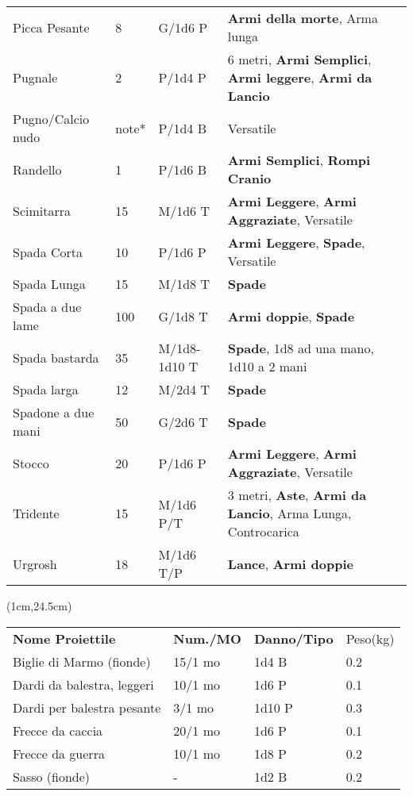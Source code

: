 \documentclass[a4paper,12 pt,openany]{book}
\begin{document}
\begin{textblock*}{19.5cm}
\begin{tabularx}{0.95\textwidth}{llll}
Picca Pesante& 8& G/1d6 P&\textbf{Armi della morte}, Arma lunga\\
Pugnale& 2& P/1d4 P& 6 metri, \textbf{Armi Semplici}, \textbf{Armi leggere}, \textbf{Armi da Lancio}\\
Pugno/Calcio nudo& note*& P/1d4 B&Versatile\\
Randello& 1& P/1d6 B& \textbf{Armi Semplici}, \textbf{Rompi Cranio}\\
Scimitarra& 15 & M/1d6 T&\textbf{Armi Leggere}, \textbf{Armi Aggraziate}, Versatile\\
Spada Corta& 10 & P/1d6 P&\textbf{Armi Leggere}, \textbf{Spade}, Versatile\\
Spada Lunga& 15 & M/1d8 T&\textbf{Spade}\\
Spada a due lame& 100& G/1d8 T& \textbf{Armi doppie}, \textbf{Spade}\\
Spada bastarda& 35 & M/1d8-1d10 T&\textbf{Spade}, 1d8 ad una mano, 1d10 a 2 mani\\
Spada larga& 12 & M/2d4 T&\textbf{Spade}\\
Spadone a due mani& 50 & G/2d6 T&\textbf{Spade}\\
Stocco& 20 & P/1d6 P& \textbf{Armi Leggere}, \textbf{Armi Aggraziate}, Versatile\\
Tridente& 15 & M/1d6 P/T& 3 metri, \textbf{Aste}, \textbf{Armi da Lancio}, Arma Lunga, Controcarica\\
Urgrosh& 18 & M/1d6 T/P& \textbf{Lance}, \textbf{Armi doppie}\\
\end{tabularx}

\end{textblock*}

\begin{textblock*}{11.5cm}(1cm,24.5cm) %

\begin{tabular}{llll}
\textbf{Nome Proiettile}   & \textbf{Num./MO} & \textbf{Danno/Tipo} & Peso(kg) \\
Biglie di Marmo (fionde)   & 15/1 mo                    & 1d4 B               & 0.2      \\
Dardi da balestra, leggeri & 10/1 mo                    & 1d6 P               & 0.1      \\
Dardi per balestra pesante & 3/1 mo                     & 1d10 P              & 0.3      \\
Frecce da caccia           & 20/1 mo                    & 1d6 P               & 0.1      \\
Frecce da guerra           & 10/1 mo                    & 1d8 P               & 0.2      \\
Sasso (fionde)             & -                          & 1d2 B               & 0.2      \\
\end{tabular}

\end{textblock*}
\end{document}
